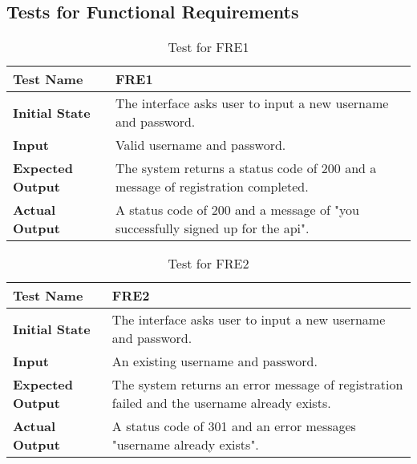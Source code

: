 \documentclass[12pt, titlepage]{article}
\begin{document}
\subsection{Tests for Functional Requirements}
	
		\begin{table}[H]
			
			\begin{tabular}[r]{|l|p{10cm}|}
				
				\hline
				
				\textbf{Test Name} & FRE1 \\ 
				\hline
				\textbf{Initial State} & The interface asks user to input a new username and password.\\ 
				\hline
				\textbf{Input} & Valid username and password. \\ 
				\hline 
				\textbf{Expected Output} & The system returns a status code of 200 and a message of registration completed.  \\ 
				\hline
				\textbf{Actual Output} & A status code of 200 and a message of "you successfully signed up for the api".  \\ 
				\hline
				
			\end{tabular}
			\caption{Test for FRE1}
			\label{Table}
		\end{table}
		
		\begin{table}[H]
			
			\begin{tabular}[r]{|l|p{10cm}|}
				
				\hline
				
				\textbf{Test Name} & FRE2 \\ 
				\hline
				\textbf{Initial State} & The interface asks user to input a new username and password.\\ 
				\hline
				\textbf{Input} & An existing username and password. \\ 
				\hline 
				\textbf{Expected Output} & The system returns an error message of registration failed and the username already exists.  \\ 
				\hline
				\textbf{Actual Output} & A status code of 301 and an error messages "username already exists".  \\ 
				\hline
				
			\end{tabular}
			\caption{Test for FRE2}
			\label{Table}
		\end{table}
		
\end{document}
